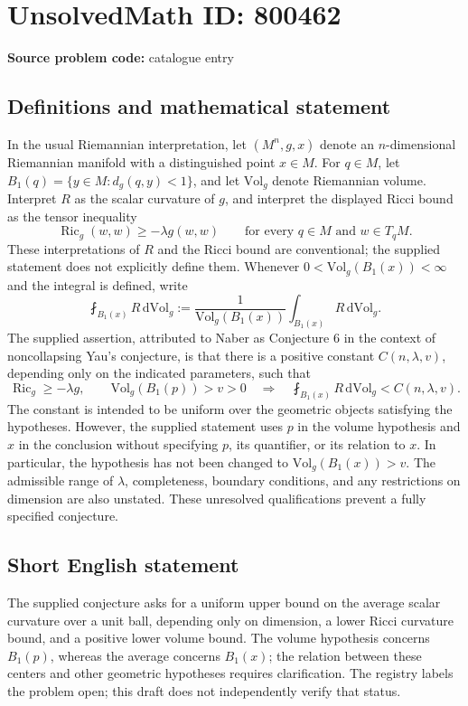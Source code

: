 \documentclass[11pt]{article}
\begin{document}
\section*{UnsolvedMath ID: 800462}
\textbf{Source problem code:} catalogue entry
\subsection{Definitions and mathematical statement}
In the usual Riemannian interpretation, let \((M^n,g,x)\) denote an \(n\)-dimensional Riemannian manifold with a distinguished point \(x\in M\). For \(q\in M\), let \(B_1(q)=\{y\in M:d_g(q,y)<1\}\), and let \(\mathrm{Vol}_g\) denote Riemannian volume. Interpret \(R\) as the scalar curvature of \(g\), and interpret the displayed Ricci bound as the tensor inequality
\[
\operatorname{Ric}_g(w,w)\geq-\lambda g(w,w)
\qquad\text{for every }q\in M\text{ and }w\in T_qM.
\]
These interpretations of \(R\) and the Ricci bound are conventional; the supplied statement does not explicitly define them. Whenever \(0<\mathrm{Vol}_g(B_1(x))<\infty\) and the integral is defined, write
\[
\fint_{B_1(x)}R\,\mathrm{d}\mathrm{Vol}_g
:=\frac{1}{\mathrm{Vol}_g(B_1(x))}
\int_{B_1(x)}R\,\mathrm{d}\mathrm{Vol}_g.
\]
The supplied assertion, attributed to Naber as Conjecture 6 in the context of noncollapsing Yau's conjecture, is that there is a positive constant \(C(n,\lambda,v)\), depending only on the indicated parameters, such that
\[
\operatorname{Ric}_g\geq-\lambda g,
\qquad \mathrm{Vol}_g(B_1(p))>v>0
\quad\Longrightarrow\quad
\fint_{B_1(x)}R\,\mathrm{d}\mathrm{Vol}_g<C(n,\lambda,v).
\]
The constant is intended to be uniform over the geometric objects satisfying the hypotheses. However, the supplied statement uses \(p\) in the volume hypothesis and \(x\) in the conclusion without specifying \(p\), its quantifier, or its relation to \(x\). In particular, the hypothesis has not been changed to \(\mathrm{Vol}_g(B_1(x))>v\). The admissible range of \(\lambda\), completeness, boundary conditions, and any restrictions on dimension are also unstated. These unresolved qualifications prevent a fully specified conjecture.
\subsection{Short English statement}
The supplied conjecture asks for a uniform upper bound on the average scalar curvature over a unit ball, depending only on dimension, a lower Ricci curvature bound, and a positive lower volume bound. The volume hypothesis concerns \(B_1(p)\), whereas the average concerns \(B_1(x)\); the relation between these centers and other geometric hypotheses requires clarification. The registry labels the problem open; this draft does not independently verify that status.
\end{document}
